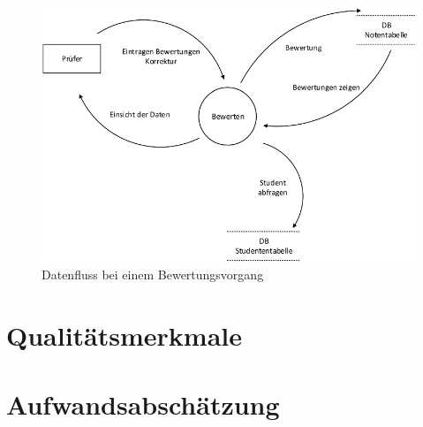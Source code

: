 \begin{appendix}
      \begin{figure}[ht]
    \centering
    \includegraphics[width=\textwidth]{./img/dfd_werten}
    \caption{Datenfluss bei einem Bewertungsvorgang}
    \label{fig:werten}
    \end{figure}
    

  \section{Qualitätsmerkmale\label{sec:quali}}
  \clearpage
  
  
  \section{Aufwandsabschätzung}
  
  
  

\end{appendix}
